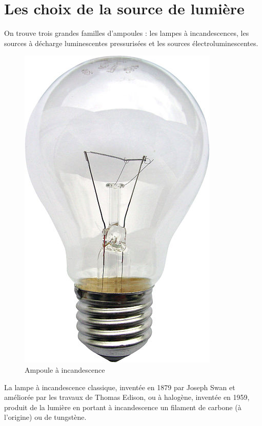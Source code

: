 


\section{Les choix de la source de lumière} %
\label{sec:les_choix_de_la_source_de_lumi_re}
	
	
On trouve trois grandes familles d'ampoules : les lampes à incandescences, les sources à décharge luminescentes pressurisées et les sources électroluminescentes.
	
\begin{figure}
  	\centering
  	\includegraphics[scale= 0.2]{images/incandescence.jpg}
  	\caption{Ampoule à incandescence}
\end{figure}
	
La lampe à incandescence classique, inventée en 1879 par Joseph Swan et améliorée par les travaux de Thomas Edison, ou à halogène, inventée en 1959, produit de la lumière en portant à incandescence un filament de carbone (à l'origine) ou de tungstène.\\
	

